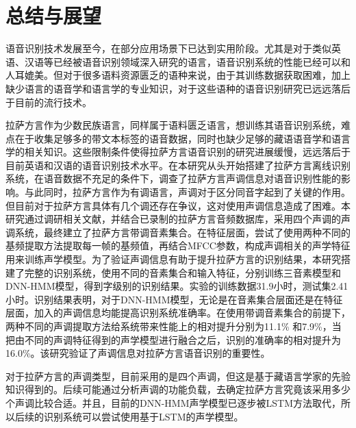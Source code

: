 
\chapter{总结与展望}
语音识别技术发展至今，在部分应用场景下已达到实用阶段。尤其是对于类似英语、汉语等已经被语音识别领域深入研究的语言，语音识别系统的性能已经可以和人耳媲美。但对于很多语料资源匮乏的语种来说，由于其训练数据获取困难，加上缺少语言的语音学和语言学的专业知识，对于这些语种的语音识别研究已远远落后于目前的流行技术。

拉萨方言作为少数民族语言，同样属于语料匮乏语言，想训练其语音识别系统，难点在于收集足够多的带文本标签的语音数据，同时也缺少足够的藏语语音学和语言学的相关知识。这些限制条件使得拉萨方言语音识别的研究进展缓慢，远远落后于目前英语和汉语的语音识别技术水平。在本研究从头开始搭建了拉萨方言离线识别系统，在语音数据不充足的条件下，调查了拉萨方言声调信息对语音识别性能的影响。与此同时，拉萨方言作为有调语言，声调对于区分同音字起到了关键的作用。但目前对于拉萨方言具体有几个调还存在争议，这对使用声调信息造成了困难。本研究通过调研相关文献，并结合已录制的拉萨方言音频数据库，采用四个声调的声调系统，最终建立了拉萨方言带调音素集合。在特征层面，尝试了使用两种不同的基频提取方法提取每一帧的基频值，再结合MFCC参数，构成声调相关的声学特征用来训练声学模型。为了验证声调信息有助于提升拉萨方言的识别结果，本研究搭建了完整的识别系统，使用不同的音素集合和输入特征，分别训练三音素模型和DNN-HMM模型，得到字级别的识别结果。实验的训练数据31.9小时，测试集2.41小时。识别结果表明，对于DNN-HMM模型，无论是在音素集合层面还是在特征层面，加入的声调信息均能提高识别系统准确率。在使用带调音素集合的前提下，两种不同的声调提取方法给系统带来性能上的相对提升分别为11.1\% 和7.9\%，当把由不同的声调特征得到的声学模型进行融合之后，识别的准确率的相对提升为16.0\%。该研究验证了声调信息对拉萨方言语音识别的重要性。

对于拉萨方言的声调类型，目前采用的是四个声调，但这是基于藏语言学家的先验知识得到的。后续可能通过分析声调的功能负载，去确定拉萨方言究竟该采用多少个声调比较合适。并且，目前的DNN-HMM声学模型已逐步被LSTM方法取代，所以后续的识别系统可以尝试使用基于LSTM的声学模型。
